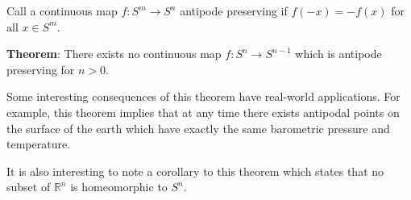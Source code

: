 \documentclass{article}
\begin{document}
Call a continuous map $f:S^m \to S^n$ antipode preserving if $f(-x)=-f(x)$ for all $x \in S^{m}$. 

\textbf{Theorem}: There exists no continuous map $f:S^{n} \to S^{n-1}$ which is antipode preserving for $n>0$.

Some interesting consequences of this theorem have real-world applications. For example, this theorem implies that at any time there exists antipodal points on the surface of the earth which have exactly the same barometric pressure and temperature.

It is also interesting to note a corollary to this theorem which states that no subset of $\mathbb{R}^{n}$ is homeomorphic to $S^{n}$.
\end{document}
